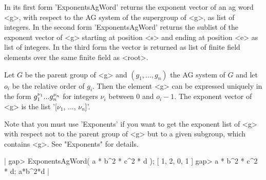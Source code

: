 In its first form 'ExponentsAgWord' returns  the exponent vector of an ag
word <g>, with respect to the AG system of the supergroup of <g>, as list
of integers.  In the second form 'ExponentsAgWord' returns the sublist of
the  exponent  vector  of <g>  starting   at position  <s> and  ending at
position <e>   as list of integers.  In   the third  form the  vector  is
returned as list of finite field elements  over the same finite  field as
<root>.

Let $G$ be the parent group of <g> and $(g_1, ..., g_n)$ the AG system of
$G$ and let $o_i$ be the relative order  of $g_i$.  Then  the element <g>
can  be expressed uniquely in the  form $g_1^{\nu_1}\* ...\* g_n^{\nu_n}$
for integers $\nu_i$ between $0$ and $o_i-1$.  The exponent vector of <g>
is the list '[$\nu_1$, ..., $\nu_n$]'.

Note that you must use 'Exponents' if  you want to  get the exponent list
of <g>  with  respect not  to  the parent  group  of <g>  but  to a given
subgroup, which contains <g>.  See "Exponents" for details.

|    gap> ExponentsAgWord( a * b^2 * c^2 * d );
    [ 1, 2, 0, 1 ]
    gap> a * b^2 * c^2 * d;
    a*b^2*d |

